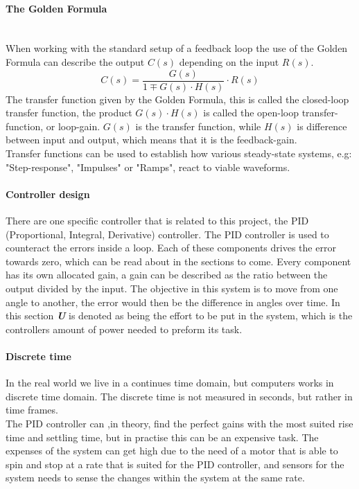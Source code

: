 \paragraph{The Golden Formula}\\

When working with the standard setup of a feedback loop the use of the Golden Formula can describe the output $C(s)$ depending on the input $R(s)$.
\begin{equation}\label{eq:GoldenFormula}
    C(s)=\frac{G(s)}{1\mp G(s)\cdot H(s)}\cdot R(s)
\end{equation}
The transfer function given by the Golden Formula, this is called the closed-loop transfer function, the product $G(s)\cdot H(s)$ is called the open-loop transfer-function, or loop-gain. $G(s)$ is the transfer function, while $H(s)$ is difference between input and output, which means that it is the feedback-gain.\\
Transfer functions can be used to establish how various steady-state systems, e.g: "Step-response", "Impulses" or "Ramps", react to viable waveforms.
\paragraph*{Controller design} \label{PID}
There are one specific controller that is related to this project, the PID (Proportional, Integral, Derivative) controller. The PID controller is used to counteract the errors inside a loop. Each of these components drives the error towards zero, which can be read about in the sections to come. Every component has its own allocated gain, a gain can be described as the ratio between the output divided by the input. The objective in this system is to move from one angle to another, the error would then be the difference in angles over time. In this section \textbf{\textit{U}} is denoted as being the effort to be put in the system, which is the controllers amount of power needed to preform its task.\\

\paragraph{Discrete time} In the real world we live in a continues time domain, but computers works in discrete time domain. The discrete time is not measured in seconds, but rather in time frames.\\
The PID controller can ,in theory, find the perfect gains with the most suited rise time and settling time, but in practise this can be an expensive task. The expenses of the system can get high due to the need of a motor that is able to spin and stop at a rate that is suited for the PID controller, and sensors for the system needs to sense the changes within the system at the same rate.\\

